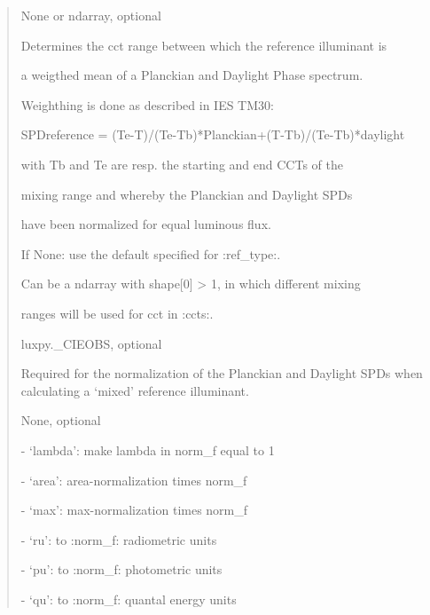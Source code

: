 \documentclass[letterpaper,10pt,english]{sphinxmanual}
\begin{document}
\begin{fulllineitems}
\begin{description}
\begin{quote}
\begin{description}
\item[{mix\_range}] \leavevmode
\begin{DUlineblock}{0em}
\item[] None or ndarray, optional
\item[] Determines the cct range between which the reference illuminant is
\item[] a weigthed mean of a Planckian and Daylight Phase spectrum. 
\item[] Weighthing is done as described in IES TM30:
\item[]
\begin{DUlineblock}{\DUlineblockindent}
\item[] SPDreference = (Te-T)/(Te-Tb)*Planckian+(T-Tb)/(Te-Tb)*daylight
\item[] with Tb and Te are resp. the starting and end CCTs of the 
\item[] mixing range and whereby the Planckian and Daylight SPDs 
\item[] have been normalized for equal luminous flux.
\end{DUlineblock}
\item[] If None: use the default specified for :ref\_type:.
\item[] Can be a ndarray with shape{[}0{]} \textgreater{} 1, in which different mixing
\item[] ranges will be used for cct in :ccts:.
\end{DUlineblock}

\item[{cieobs}] \leavevmode
\begin{DUlineblock}{0em}
\item[] luxpy.\_CIEOBS, optional
\item[] Required for the normalization of the Planckian and Daylight SPDs 
when calculating a ‘mixed’ reference illuminant.
\end{DUlineblock}

\item[{norm\_type}] \leavevmode
\begin{DUlineblock}{0em}
\item[] None, optional 
\item[]
\begin{DUlineblock}{\DUlineblockindent}
\item[] - ‘lambda’: make lambda in norm\_f equal to 1
\item[] - ‘area’: area-normalization times norm\_f
\item[] - ‘max’: max-normalization times norm\_f
\item[] - ‘ru’: to :norm\_f: radiometric units 
\item[] - ‘pu’: to :norm\_f: photometric units 
\item[] - ‘qu’: to :norm\_f: quantal energy units
\end{DUlineblock}
\end{DUlineblock}


\end{description}
\end{quote}
\end{description}
\end{fulllineitems}
\end{document}
